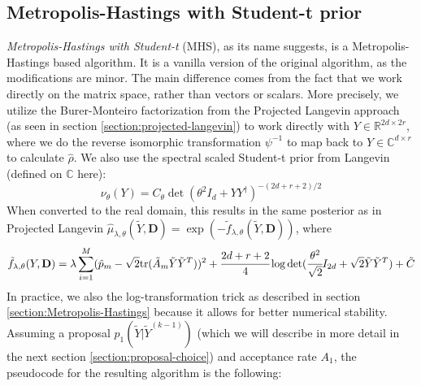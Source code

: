 \documentclass[12pt]{memoir}
\newcommand{\tr}{\text{tr}}
\newcommand{\mb}{\mathbf}
\begin{document}
\subsection*{Metropolis-Hastings with Student-t prior}
\textit{Metropolis-Hastings with Student-t} (MHS), as its name suggests, is a Metropolis-Hastings based algorithm. It is a vanilla version of the original algorithm, as the modifications are minor. The main difference comes from the fact that we work directly on the matrix space, rather than vectors or scalars. More precisely, we utilize the Burer-Monteiro factorization from the Projected Langevin approach (as seen in section \ref{section:projected-langevin}) to work directly with $Y \in \mathbb{R}^{2d \times 2r}$, where we do the reverse isomorphic transformation $\psi^{-1}$ to map back to $Y \in \mathbb{C}^{d\times r}$ to calculate $\hat \rho$. We also use the spectral scaled Student-t prior from Langevin (defined on $\mathbb{C}$ here):
\begin{equation}
    \nu_{\theta} (Y) = C_\theta \det(\theta^2I_d + YY^\dagger)^{-(2d+r+2)/2}
\end{equation}
When converted to the real domain, this results in the same posterior as in Projected Langevin $\hat \mu_{\lambda, \theta}(\tilde Y, \mb D) =\exp(-\tilde f_{\lambda, \theta}(\tilde Y, \mb D))$, where 
\begin{equation}
    \tilde f_{\lambda, \theta}(Y, \mb D) = \lambda \sum^{M}_{i=1} (\hat p_m - \sqrt{2}\tr(\tilde A_m \tilde Y \tilde Y^{T}))^2 + \cfrac{2d + r + 2}{4}\log \det(\cfrac{\theta^2}{\sqrt 2}I_{2d} + \sqrt 2 \tilde Y \tilde Y^{T}) + \tilde C
\end{equation}
In practice, we also the log-transformation trick as described in section \ref{section:Metropolis-Hastings} because it allows for better numerical stability. Assuming a proposal $p_1(\tilde Y|\tilde Y^{(k-1)})$ (which we will describe in more detail in the next section \ref{section:proposal-choice}) and acceptance rate $A_1$, the pseudocode for the resulting algorithm is the following:\medbreak
\end{document}
